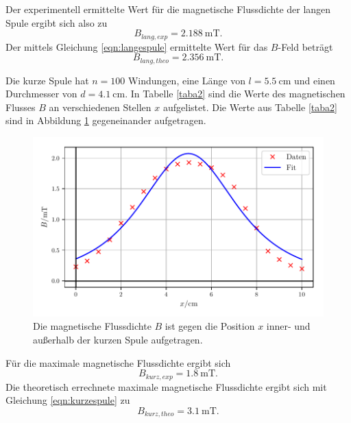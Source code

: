 \noindent Der experimentell ermittelte Wert für die 
magnetische Flussdichte der langen Spule ergibt sich also zu
\begin{equation*}
    B_{lang,exp} = \SI{2.188}{\milli\tesla}.
\end{equation*}
Der mittels Gleichung \eqref{eqn:langespule} ermittelte Wert für
das $B$-Feld beträgt
\begin{equation*}
    B_{lang,theo} = \SI{2.356}{\milli\tesla}.
\end{equation*}

\newpage %
\noindent Die kurze Spule hat $n = \num{100}$ Windungen, eine Länge von
$l = \SI{5.5}{\centi\meter}$ und einen Durchmesser von
$d = \SI{4.1}{\centi\meter}$.
In Tabelle \ref{taba2} sind die Werte des magnetischen Flusses $B$
an verschiedenen Stellen $x$ aufgelistet.
Die Werte aus Tabelle \ref{taba2} sind in Abbildung \ref{plota2}
gegeneinander aufgetragen.


\begin{figure}
    \centering
    \includegraphics{build/plota2.pdf}
    \caption{Die magnetische Flussdichte $B$ ist gegen die Position $x$ inner-
    und außerhalb der kurzen Spule aufgetragen.}
    \label{plota2}
\end{figure}

\noindent Für die maximale magnetische Flussdichte ergibt sich 
\begin{equation*}
   B_{kurz,exp} = \SI{1.8}{\milli\tesla}.
\end{equation*}
Die theoretisch errechnete maximale magnetische Flussdichte
ergibt sich mit Gleichung \eqref{eqn:kurzespule} zu
\begin{equation*}
   B_{kurz,theo} = \SI{3.1}{\milli\tesla}.
\end{equation*}

